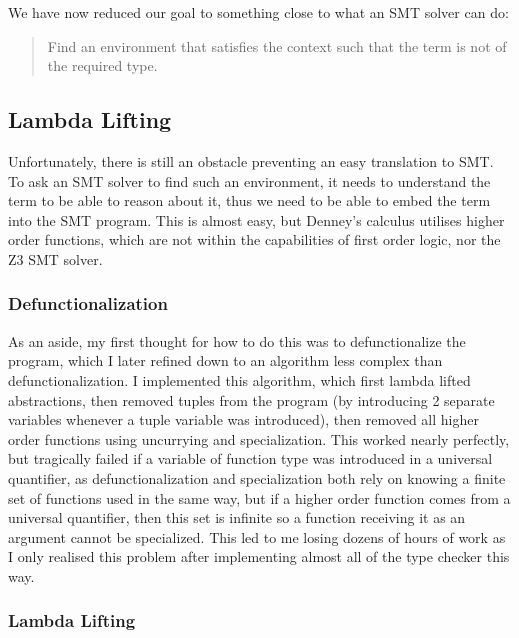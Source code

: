We have now reduced our goal to something close to what an SMT solver can do:

\begin{quote}
    Find an environment that satisfies the context such that the term is not of the required type.
\end{quote}

\subsection{Lambda Lifting}

Unfortunately, there is still an obstacle preventing an easy translation to SMT.
To ask an SMT solver to find such an environment, it needs to understand the term to be able to reason
about it, thus we need to be able to embed the term into the SMT program.
This is almost easy, but Denney's calculus utilises higher order functions, which are not within
the capabilities of first order logic, nor the Z3 SMT solver.

\subsubsection{Defunctionalization}

As an aside, my first thought for how to do this was to defunctionalize the program, which I later
refined down to an algorithm less complex than defunctionalization.
I implemented this algorithm, which first lambda lifted abstractions, then removed tuples from the
program (by introducing 2 separate variables whenever a tuple variable was introduced), then removed
all higher order functions using uncurrying and specialization.
This worked nearly perfectly, but tragically failed if a variable of function type was introduced
in a universal quantifier, as defunctionalization and specialization both rely on knowing a finite
set of functions used in the same way, but if a higher order function comes from a universal
quantifier, then this set is infinite so a function receiving it as an argument cannot be specialized.
This led to me losing dozens of hours of work as I only realised this problem after implementing
almost all of the type checker this way.

\subsubsection{Lambda Lifting}

